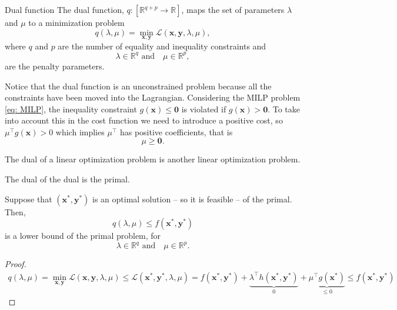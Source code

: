 \begin{definition}{Dual function}{}
The dual function, $q: \left[\mathbb{R}^{q+p}\rightarrow\mathbb{R}\right]$, maps the set of parameters $\lambda$ and $\mu$ to a minimization problem
\begin{equation}
    q(\lambda, \mu) = \min_{\mathbf{x}, \mathbf{y}}\mathcal{L}(\mathbf{x},\mathbf{y}, \lambda, \mu),
\end{equation}
where $q$ and $p$ are the number of equality and inequality constraints and
\begin{equation}
    \lambda\in\mathbb{R}^{q}\,\, \text{and} \quad \mu\in\mathbb{R}^{p},
\end{equation}
are the penalty parameters.
\end{definition}
Notice that the dual function is an unconstrained problem because all the constraints have been moved into the Lagrangian.
Considering the MILP problem \eqref{eq: MILP}, the inequality constraint $g(\mathbf{x})\leq \mathbf{0}$ is violated if $g(\mathbf{x})>\mathbf{0}$. To take into account this in the cost function we need to introduce a positive cost, so $\mu^{\intercal}g(\mathbf{x})>0$ which implies $\mu^{\intercal}$ has positive coefficients, that is
\begin{equation}
    \mu \geq \mathbf{0}.
\end{equation}
\begin{theorem}{}{}
The dual of a linear optimization problem is another linear optimization problem.
\end{theorem}
\begin{theorem}{}{}
The dual of the dual is the primal.
\end{theorem}
\begin{theorem}{}{}
Suppose that $(\mathbf{x}^{*}, \mathbf{y}^{*})$ is an optimal solution -- so it is feasible -- of the primal. Then,
\begin{equation}
    q(\lambda, \mu) \leq f(\mathbf{x}^{*},\mathbf{y}^{*})
\end{equation}
is a lower bound of the primal problem, for
\begin{equation}
    \lambda\in\mathbb{R}^{q}\,\, \text{and} \quad \mu\in\mathbb{R}^{p}.
\end{equation}
\end{theorem}
\begin{proof}
\begin{align}
    q(\lambda, \mu) = \min_{\mathbf{x}, \mathbf{y}} \mathcal{L}(\mathbf{x}, \mathbf{y}, \lambda, \mu) \leq \mathcal{L}(\mathbf{x}^{*}, \mathbf{y}^{*}, \lambda, \mu) = f(\mathbf{x}^{*}, \mathbf{y}^{*}) + \underbrace{\lambda^{\intercal}h(\mathbf{x}^{*}, \mathbf{y}^{*})}_{0} + \underbrace{\mu^{\intercal}g(\mathbf{x}^{*})}_{\leq 0} \leq f(\mathbf{x}^{*}, \mathbf{y}^{*})
\end{align}
\end{proof}
